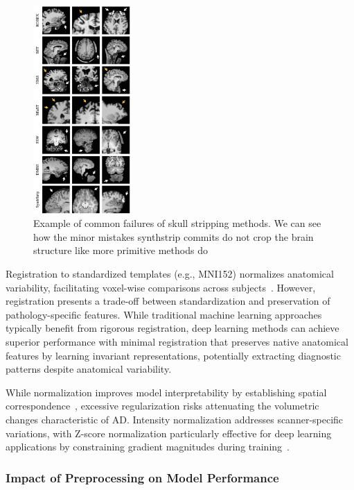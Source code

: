 \documentclass[11pt, a4paper]{article}
\begin{document}
\begin{figure}[htbp]
  \centering
  \includegraphics[width=0.33\textwidth]{figures/ss_fails.png}
  \caption{Example of common failures of skull stripping methods. We can see how the minor mistakes synthstrip commits do not crop the brain structure like more primitive methods do~\cite{hoopes2022synthstrip}}
  \label{fig:skull_stripping}
\end{figure}

Registration to standardized templates (e.g., MNI152) normalizes anatomical variability, facilitating voxel-wise comparisons across subjects~\cite{garg2023review}. However, registration presents a trade-off between standardization and preservation of pathology-specific features. While traditional machine learning approaches typically benefit from rigorous registration, deep learning methods can achieve superior performance with minimal registration that preserves native anatomical features by learning invariant representations, potentially extracting diagnostic patterns despite anatomical variability.

While normalization improves model interpretability by establishing spatial correspondence~\cite{viswan2025enhancing}, excessive regularization risks attenuating the volumetric changes characteristic of AD. Intensity normalization addresses scanner-specific variations, with Z-score normalization particularly effective for deep learning applications by constraining gradient magnitudes during training~\cite{viswan2025enhancing}.

\subsubsection{Impact of Preprocessing on Model Performance}
\end{document}
